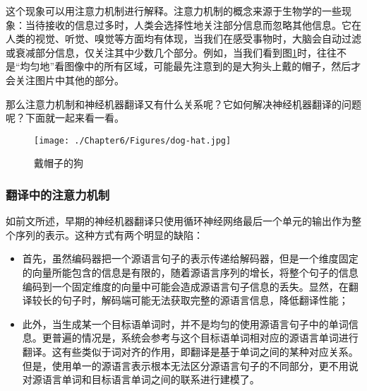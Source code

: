 \parinterval 这个现象可以用注意力机制进行解释。注意力机制的概念来源于生物学的一些现象：当待接收的信息过多时，人类会选择性地关注部分信息而忽略其他信息。它在人类的视觉、听觉、嗅觉等方面均有体现，当我们在感受事物时，大脑会自动过滤或衰减部分信息，仅关注其中少数几个部分。例如，当我们看到图\ref{fig:6-20}时，往往不是``均匀地''看图像中的所有区域，可能最先注意到的是大狗头上戴的帽子，然后才会关注图片中其他的部分。

\parinterval 那么注意力机制和神经机器翻译又有什么关系呢？它如何解决神经机器翻译的问题呢？下面就一起来看一看。

\begin{figure}[htp]
\centering
\texttt{[image: ./Chapter6/Figures/dog-hat.jpg]}
\caption{戴帽子的狗}
\label{fig:6-20}
\end{figure}


\subsubsection{翻译中的注意力机制}

\parinterval 如前文所述，早期的神经机器翻译只使用循环神经网络最后一个单元的输出作为整个序列的表示。这种方式有两个明显的缺陷：

\begin{itemize}
\vspace{0.5em}
\item 首先，虽然编码器把一个源语言句子的表示传递给解码器，但是一个维度固定的向量所能包含的信息是有限的，随着源语言序列的增长，将整个句子的信息编码到一个固定维度的向量中可能会造成源语言句子信息的丢失。显然，在翻译较长的句子时，解码端可能无法获取完整的源语言信息，降低翻译性能；
\vspace{0.5em}
\item 此外，当生成某一个目标语单词时，并不是均匀的使用源语言句子中的单词信息。更普遍的情况是，系统会参考与这个目标语单词相对应的源语言单词进行翻译。这有些类似于词对齐的作用，即翻译是基于单词之间的某种对应关系。但是，使用单一的源语言表示根本无法区分源语言句子的不同部分，更不用说对源语言单词和目标语言单词之间的联系进行建模了。
\vspace{0.5em}
\end{itemize}

